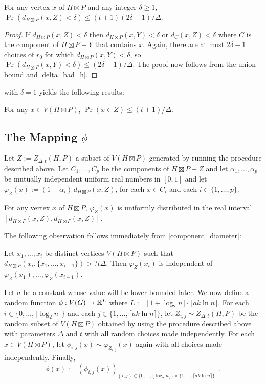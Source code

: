 \documentclass{patmorin}
\begin{document}
\begin{lem}\label{delta_bad_product}
  For any vertex $x$ of $H\boxtimes P$ and any integer $\delta\ge 1$, $\Pr(d_{H\boxtimes P}(x,Z)< \delta)\le (t+1)(2\delta-1)/\Delta$.
\end{lem}

\begin{proof}
  If $d_{H\boxtimes P}(x,Z)<\delta$ then $d_{H\boxtimes P}(x,Y)<\delta$ or $d_{C}(x,Z)<\delta$ where $C$ is the component of $H\boxtimes P-Y$ that contains $x$.  Again, there are at most $2\delta-1$ choices of $r_0$ for which $d_{H\boxtimes P}(x,Y)<\delta$, so $\Pr(d_{H\boxtimes P}(x,Y)<\delta)\le (2\delta-1)/\Delta$.  The proof now follows from the union bound and \cref{delta_bad_h}.
\end{proof}

 with $\delta=1$ yields the following results:

\begin{cor}
  For any $x\in V(H\boxtimes P)$, $\Pr(x\in Z)\le (t+1)/\Delta$.
\end{cor}

\subsection{\boldmath The Mapping $\phi$}

Let $Z:=Z_{\Delta,t}(H,P)$ a subset of $V(H\boxtimes P)$ generated by running the procedure described above.  Let $C_1,\ldots,C_p$ be the components of $H\boxtimes P-Z$ and let $\alpha_1,\ldots,\alpha_p$ be mutually independent uniform real numbers in $[0,1]$ and let $\varphi_Z(x):=(1+\alpha_i)\,d_{H\boxtimes P}(x,Z)$, for each $x\in C_i$ and each $i\in\{1,\ldots,p\}$.

\begin{obs}\label{uniform}
  For any vertex $x$ of $H\boxtimes P$, $\varphi_Z(x)$ is uniformly distributed in the real interval $[d_{H\boxtimes P}(x,Z), d_{H\boxtimes P}(x,Z)]$.
\end{obs}

The following observation follows immediately from \cref{component_diameter}:
\begin{obs}\label{independent}
  Let $x_1,\ldots,x_i$ be distinct vertices $V(H\boxtimes P)$ such that $d_{H\boxtimes P}(x_i,\{x_1,\ldots,x_{i-1}\})> ?t\Delta$. Then $\varphi_Z(x_i)$ is independent of $\varphi_Z(x_1),\ldots,\varphi_Z(x_{i-1})$.
\end{obs}


Let $a$ be a constant whose value will be lower-bounded later.  We now define a random function $\phi:V(G)\to\mathbb{R}^{L}$ where $L:=\lfloor 1+\log_2 n\rfloor\cdot\lceil a k\ln n\rceil$. For each $i\in\{0,\ldots,\lfloor \log_2 n\rfloor\}$ and each $j\in\{1,\ldots,\lceil a k\ln n\rceil\}$, let $Z_{i,j}\sim Z_{\Delta,t}(H,P)$ be the random subset of $V(H\boxtimes P)$ obtained by using the procedure described above with parameters $\Delta$ and $t$ with all random choices made independently.  For each $x\in V(H\boxtimes P)$, let $\phi_{i,j}(x)\sim \varphi_{Z_{i,j}}(x)$ again with all choices made independently.  Finally,
\[
   \phi(x) := (\phi_{i,j}(x))_{(i,j)\in \{0,\ldots,\lfloor \log_2 n\rfloor\}\times\{1,\ldots,\lceil a k\ln n\rceil\}} \enspace .
\]
\end{document}
